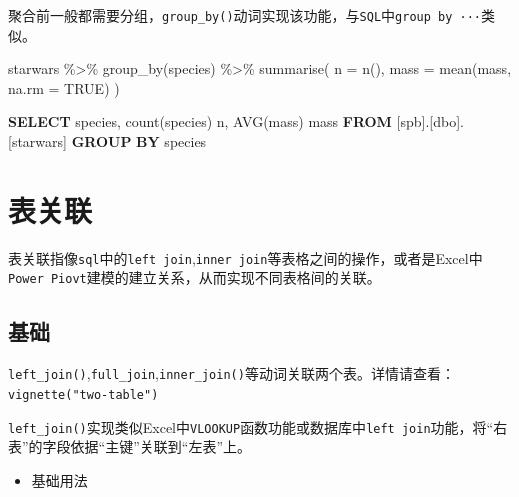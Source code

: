 \documentclass[
]{book}
\newenvironment{Shaded}{\begin{snugshade}}{\end{snugshade}}
\newcommand{\AttributeTok}[1]{\textcolor[rgb]{0.77,0.63,0.00}{#1}}
\newcommand{\ConstantTok}[1]{\textcolor[rgb]{0.00,0.00,0.00}{#1}}
\newcommand{\FunctionTok}[1]{\textcolor[rgb]{0.00,0.00,0.00}{#1}}
\newcommand{\KeywordTok}[1]{\textcolor[rgb]{0.13,0.29,0.53}{\textbf{#1}}}
\newcommand{\NormalTok}[1]{#1}
\newcommand{\SpecialCharTok}[1]{\textcolor[rgb]{0.00,0.00,0.00}{#1}}
\providecommand{\tightlist}{%
  \setlength{\itemsep}{0pt}\setlength{\parskip}{0pt}}
\begin{document}
聚合前一般都需要分组，\texttt{group\_by()}动词实现该功能，与\texttt{SQL}中\texttt{group\ by\ ···}类似。

\begin{Shaded}
\begin{Highlighting}[]
\NormalTok{starwars }\SpecialCharTok{\%\textgreater{}\%}
  \FunctionTok{group\_by}\NormalTok{(species) }\SpecialCharTok{\%\textgreater{}\%}
  \FunctionTok{summarise}\NormalTok{(}
    \AttributeTok{n =} \FunctionTok{n}\NormalTok{(),}
    \AttributeTok{mass =} \FunctionTok{mean}\NormalTok{(mass, }\AttributeTok{na.rm =} \ConstantTok{TRUE}\NormalTok{)}
\NormalTok{  )}
\end{Highlighting}
\end{Shaded}

\begin{Shaded}
\begin{Highlighting}[]
\KeywordTok{SELECT}\NormalTok{ species,}
  \FunctionTok{count}\NormalTok{(species) n,}
  \FunctionTok{AVG}\NormalTok{(mass) mass}
\KeywordTok{FROM}\NormalTok{ [spb].[dbo].[starwars]}
\KeywordTok{GROUP} \KeywordTok{BY}\NormalTok{  species}
\end{Highlighting}
\end{Shaded}

\hypertarget{dplyr:merge-table}{%
\section{表关联}\label{dplyr:merge-table}}

表关联指像\texttt{sql}中的\texttt{left\ join},\texttt{inner\ join}等表格之间的操作，或者是Excel中\texttt{Power\ Piovt}建模的建立关系，从而实现不同表格间的关联。

\hypertarget{ux57faux7840}{%
\subsection{基础}\label{ux57faux7840}}

\texttt{left\_join()},\texttt{full\_join},\texttt{inner\_join()}等动词关联两个表。详情请查看：\texttt{vignette("two-table")}

\texttt{left\_join()}实现类似Excel中\texttt{VLOOKUP}函数功能或数据库中\texttt{left\ join}功能，将``右表''的字段依据``主键''关联到``左表''上。

\begin{itemize}
\tightlist
\item
  基础用法
\end{itemize}
\end{document}
